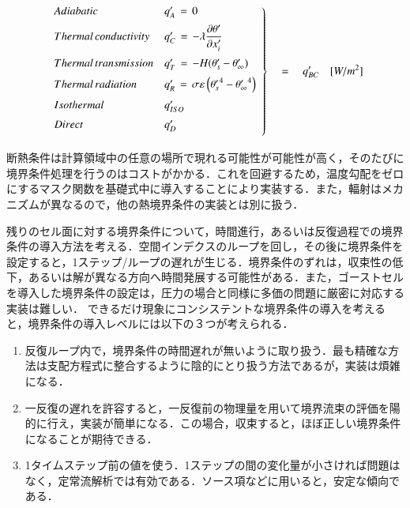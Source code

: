 \begin{equation}
\left.
\begin{array}{ll}
\vspace{2mm}
Adiabatic & q_{A}^{\prime}\,=\,0\\
\vspace{2mm}
Thermal\, conductivity & q_{C}^{\prime}\,=\,\displaystyle -\lambda\frac{\partial\theta^{\prime}}{\partial x_{i}^{\prime}}\\
\vspace{2mm}
Thermal\, transmission & q_{T}^{\prime}\,=\,-H(\theta_{s}^{\prime}-\theta_{\infty}^{\prime})\\
\vspace{2mm}
Thermal\, radiation & q_{R}^{\prime}\,=\,\sigma \varepsilon \left( {\theta_{s}^{\prime}}^{4} - {\theta_{\infty}^{\prime}}^{4} \right)\\
\vspace{2mm}
Isothermal & q_{ISO}^{\prime}\\
\vspace{2mm}
Direct & q_{D}^{\prime}
\end{array} \right\} \quad = \quad q_{BC}^{\prime}\quad [W/m^2]
\label{eq:thermal bc}
\end{equation}

\noindent 断熱条件は計算領域中の任意の場所で現れる可能性が可能性が高く，そのたびに境界条件処理を行うのはコストがかかる．これを回避するため，温度勾配をゼロにするマスク関数を基礎式中に導入することにより実装する．また，輻射はメカニズムが異なるので，他の熱境界条件の実装とは別に扱う．

残りのセル面に対する境界条件について，時間進行，あるいは反復過程での境界条件の導入方法を考える．空間インデクスのループを回し，その後に境界条件を設定すると，1ステップ/ループの遅れが生じる．境界条件のずれは，収束性の低下，あるいは解が異なる方向へ時間発展する可能性がある．また，ゴーストセルを導入した境界条件の設定は，圧力の場合と同様に多価の問題に厳密に対応する実装は難しい．
できるだけ現象にコンシステントな境界条件の導入を考えると，境界条件の導入レベルには以下の３つが考えられる．

\begin{enumerate}
\item 反復ループ内で，境界条件の時間遅れが無いように取り扱う．最も精確な方法は支配方程式に整合するように陰的にとり扱う方法であるが，実装は煩雑になる．
\item 一反復の遅れを許容すると，一反復前の物理量を用いて境界流束の評価を陽的に行え，実装が簡単になる．この場合，収束すると，ほぼ正しい境界条件になることが期待できる．
\item 1タイムステップ前の値を使う．1ステップの間の変化量が小さければ問題はなく，定常流解析では有効である．ソース項などに用いると，安定な傾向である．
\end{enumerate}

